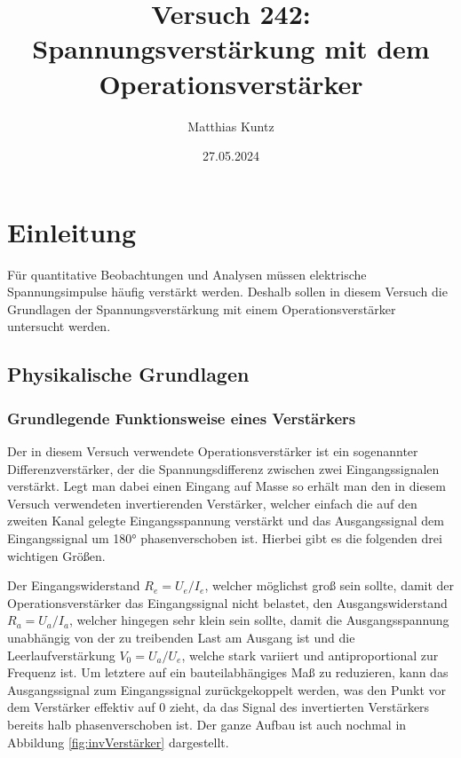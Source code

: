 \documentclass{article}
\title{Versuch 242: Spannungsverstärkung mit dem Operationsverstärker}
\author{Matthias Kuntz}
\date{27.05.2024}
\begin{document}
\maketitle

\tableofcontents

\newpage

\section{Einleitung}

Für quantitative Beobachtungen und Analysen müssen elektrische Spannungsimpulse häufig verstärkt werden. Deshalb sollen in diesem Versuch die Grundlagen der Spannungsverstärkung mit einem Operationsverstärker untersucht werden. 






\subsection{Physikalische Grundlagen}

\subsubsection{Grundlegende Funktionsweise eines Verstärkers}

Der in diesem Versuch verwendete Operationsverstärker ist ein sogenannter Differenzverstärker, der die Spannungsdifferenz zwischen zwei Eingangssignalen verstärkt. Legt man dabei einen Eingang auf Masse so erhält man den in diesem Versuch verwendeten invertierenden Verstärker, welcher einfach die auf den zweiten Kanal gelegte Eingangsspannung verstärkt und das Ausgangssignal dem Eingangssignal um 180° phasenverschoben ist. Hierbei gibt es die folgenden drei wichtigen Größen.

Der Eingangswiderstand $R_e = U_e/I_e$, welcher möglichst groß sein sollte, damit der Operationsverstärker das Eingangssignal nicht belastet, den Ausgangswiderstand $R_a = U_a/I_a$, welcher hingegen sehr klein sein sollte, damit die Ausgangsspannung unabhängig von der zu treibenden Last am Ausgang ist und die Leerlaufverstärkung $V_0 = U_a/U_e$, welche stark variiert und antiproportional zur Frequenz ist. Um letztere auf ein bauteilabhängiges Maß zu reduzieren, kann das Ausgangssignal zum Eingangssignal zurückgekoppelt werden, was den Punkt vor dem Verstärker effektiv auf 0 zieht, da das Signal des invertierten Verstärkers bereits halb phasenverschoben ist. Der ganze Aufbau ist auch nochmal in Abbildung \ref{fig:invVerstärker} dargestellt.
\end{document}
